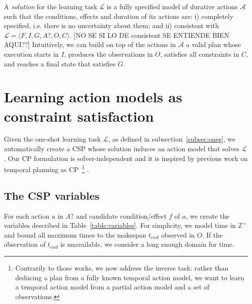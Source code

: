 \documentclass{ecai}
\newcommand{\tup}[1]{{\langle #1 \rangle}}
\begin{document}
A {\em solution} for the learning task $\mathcal{L}$ is a fully specified model of durative actions $\mathcal{A}$ such that the conditions, effects and duration of its actions are: i) completely specified, i.e. there is no uncertainty about them; and ii) 
{consistent} with $\mathcal{L}=\tup{F,I,G,A?,O,C}$. [NO SE SI LO DE consistent SE ENTIENDE BIEN AQUI??] Intuitively, we can build on top of the actions in $\mathcal{A}$ a valid plan whose execution starts in $I$, produces the observations in $O$, satisfies all constraints in $C$, and reaches a final state that satisfies $G$. 



\section{Learning action models as constraint satisfaction}
\label{subsec:CPformulation}
Given the one-shot learning task $\mathcal{L}$, as defined in subsection~\ref{subsec:ones}, we automatically create a CSP whose solution induces an action model that solves $\mathcal{L}$. Our CP formulation is solver-independent 
and it is inspired by previous work on temporal planning as CP~\cite{garrido2009constraint,vidal2006branching}\footnote{Contrarily to those works, we now address the inverse task: rather than deducing a plan from a fully known temporal action model, we want to learn a temporal action model from a partial action model and a set of observations.} .


\subsection{The CSP variables}

For each action $a$ in $A?$ and candidate condition/effect $f$ of $a$, we create the variables described in Table~\ref{table:variables}. For simplicity, we model time in $\mathbb{Z}^+$ and bound all maximum times to the makespan $t_{end}$ observed in $O$. If the observation of $t_{end}$ is unavailable, we consider a long enough domain for time.
\end{document}
